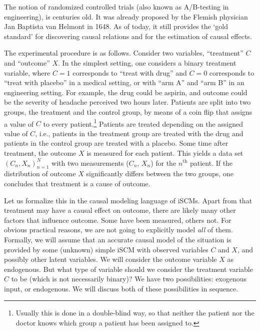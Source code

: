 The notion of randomized controlled trials (also known as A/B-testing in engineering), 
is centuries old. It was already proposed by the Flemish physician Jan Baptista van
Helmont \cite{vanHelmont1648} in 1648. As of today, it still provides the `gold standard'
for discovering causal relations and for the estimation of causal effects.

The experimental procedure is as follows.
Consider two variables, ``treatment'' $C$ and ``outcome'' $X$. 
In the simplest setting, one considers a 
binary treatment variable, where $C=1$ corresponds to ``treat with drug'' and
$C=0$ corresponds to ``treat with placebo'' in a medical setting, or with ``arm A''
and ``arm B'' in an engineering setting. For example, the drug could be aspirin,
and outcome could be the severity of headache perceived two
hours later. Patients are split into two groups,
the treatment and the control group, by means of a coin flip that assigns a value
of $C$ to every patient.\footnote{Usually this is done in a double-blind way, so
that neither the patient nor the doctor knows which group a patient has been assigned
to.} Patients are treated depending on the assigned value of $C$, i.e., patients in the
treatment group are treated with the drug and patients in the control group are treated
with a placebo. Some time after treatment, the outcome $X$ is measured for each patient. 
This yields a data set $(C_n,X_n)_{n=1}^N$
with two measurements ($C_n$, $X_n$) for the $n^{\mathrm{th}}$ patient. 
If the distribution of outcome $X$ significantly differs between the two groups,
one concludes that treatment is a cause of outcome. 

Let us formalize this in the causal modeling language of iSCMs.
Apart from that treatment may have a causal 
effect on outcome, there are likely many other factors that influence outcome. Some
have been measured, others not. For obvious practical reasons, we are not going 
to explicitly model \emph{all} of them. Formally, we will assume that an accurate
causal model of the situation is provided by some (unknown) simple iSCM with observed
variables $C$ and $X$, and possibly other latent variables.
We will consider the outcome variable $X$ as endogenous. 
But what type of variable should we consider
the treatment variable $C$ to be (which is not necessarily binary)?
We have two possibilities: exogenous input, or endogenous. We will
discuss both of these possibilities in sequence.


